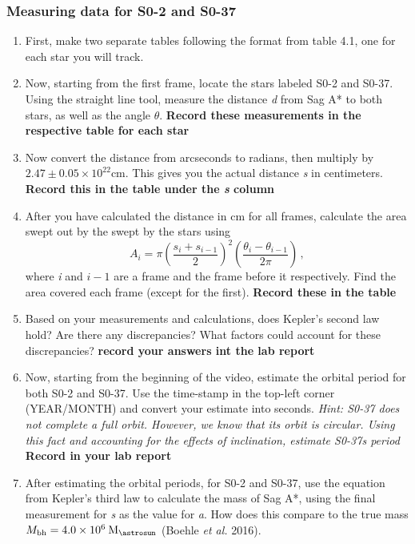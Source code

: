 \subsubsection{Measuring data for S0-2 and S0-37}
\begin{enumerate}
	\item First, make two separate tables following the format from table 4.1, one for each star you will track.
	
	\item Now, starting from the first frame, locate the stars labeled S0-2 and S0-37. Using the straight line tool, measure the distance \textit{d} from Sag A* to both stars, as well as the angle $\theta$.  \textbf{Record these measurements in the respective table for each star}
	
	\item Now convert the distance from arcseconds to radians, then multiply by $2.47 \pm 0.05 \times 10^22$cm. This gives you the actual distance \textit{s} in centimeters. \textbf{Record this in the table under the \textit{s} column}
	
	\item After you have calculated the distance in cm for all frames, calculate the area swept out by the swept by the stars using
	\begin{equation}
		A_i = \pi \left( \frac{s_{i} + s_{i-1}}{2} \right)^2 \left( \frac{\theta_{i}-\theta_{i-1}}{2\pi} \right) \,,
	\end{equation}
	where \textit{i} and $i-1$ are a frame and the frame before it respectively. Find the area covered each frame (except for the first). \textbf{Record these in the table}
	
	\item Based on your measurements and calculations, does Kepler's second law hold? Are there any discrepancies? What factors could account for these discrepancies? \textbf{record your answers int the lab report}
	
	\item Now, starting from the beginning of the video, estimate the orbital period for both S0-2 and S0-37. Use the time-stamp in the top-left corner (YEAR/MONTH) and convert your estimate into seconds. \textit{Hint: S0-37 does not complete a full orbit. However, we know that its orbit is circular. Using this fact and accounting for the effects of inclination, estimate S0-37s period} \textbf{Record in your lab report}
	
	\item After estimating the orbital periods, for S0-2 and S0-37, use the equation from Kepler's third law to calculate the mass of Sag A*, using the final measurement for \textit{s} as the value for \textit{a}. How does this compare to the true mass $M_\mathrm{bh} = 4.0 \times 10^6\:\textrm{M}_\textrm{\astrosun}$ (Boehle \textit{et al.} 2016). 
	

\end{enumerate}
